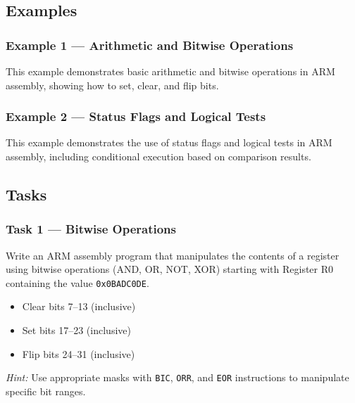 \subsection{Examples}

\subsubsection{Example 1 --- Arithmetic and Bitwise Operations}
This example demonstrates basic arithmetic and bitwise operations in ARM assembly, showing how to set, clear, and flip bits.


\newpage
\subsubsection{Example 2 --- Status Flags and Logical Tests}
This example demonstrates the use of status flags and logical tests in ARM assembly, including conditional execution based on comparison results.



\subsection{Tasks}

\subsubsection{Task 1 --- Bitwise Operations}
Write an ARM assembly program that manipulates the contents of a register using bitwise operations (AND, OR, NOT, XOR) starting with Register R0 containing the value \texttt{0x0BADC0DE}.
\begin{itemize}[nosep]
    \item Clear bits 7--13 (inclusive)
    \item Set bits 17--23 (inclusive)
    \item Flip bits 24--31 (inclusive)
\end{itemize}

\emph{Hint:} Use appropriate masks with \texttt{BIC}, \texttt{ORR}, and \texttt{EOR} instructions to manipulate specific bit ranges.

